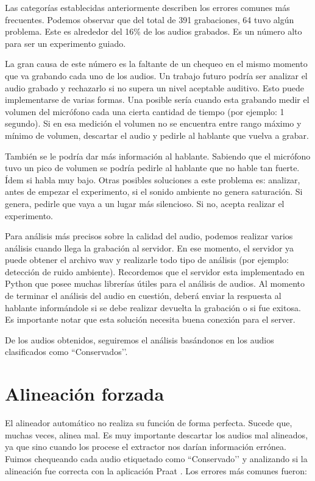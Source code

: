 Las categorías establecidas anteriormente describen los errores comunes más frecuentes. Podemos observar que del total de 391 grabaciones, 64 tuvo algún problema. Este es alrededor del 16\% de los audios grabados. Es un número alto para ser un experimento guiado.

La gran causa de este número es la faltante de un chequeo en el mismo momento que va grabando cada uno de los audios. Un trabajo futuro podría ser analizar el audio grabado y rechazarlo si no supera un nivel aceptable auditivo. Esto puede implementarse de varias formas. Una posible sería cuando esta grabando medir el volumen del micrófono cada una cierta cantidad de tiempo (por ejemplo: 1 segundo). Si en esa medición el volumen no se encuentra entre rango máximo y mínimo de volumen, descartar el audio y pedirle al hablante que vuelva a grabar.

También se le podría dar más información al hablante. Sabiendo que el micrófono tuvo un pico de volumen se podría pedirle al hablante que no hable tan fuerte. Ídem si habla muy bajo. Otras posibles soluciones a este problema es: analizar, antes de empezar el experimento, si el sonido ambiente no genera saturación. Si genera, pedirle que vaya a un lugar más silencioso. Si no, acepta realizar el experimento.

Para análisis más precisos sobre la calidad del audio, podemos realizar varios análisis cuando llega la grabación al servidor. En ese momento, el servidor ya puede obtener el archivo wav y realizarle todo tipo de análisis (por ejemplo: detección de ruido ambiente). Recordemos que el servidor esta implementado en Python que posee muchas librerías útiles para el análisis de audios. Al momento de terminar el análisis del audio en cuestión, deberá enviar la respuesta al hablante informándole si se debe realizar devuelta la grabación o si fue exitosa. Es importante notar que esta solución necesita buena conexión para el server. 

De los audios obtenidos, seguiremos el análisis basándonos en los audios clasificados como ``Conservados’’.

\section{Alineación forzada}

El alineador automático no realiza su función de forma perfecta. Sucede que, muchas veces, alinea mal. Es muy importante descartar los audios mal alineados, ya que sino cuando los procese el extractor nos darían información errónea. Fuimos chequeando cada audio etiquetado como ``Conservado’’ y analizando si la alineación fue correcta con la aplicación Praat \cite{praat}. Los errores más comunes fueron:

